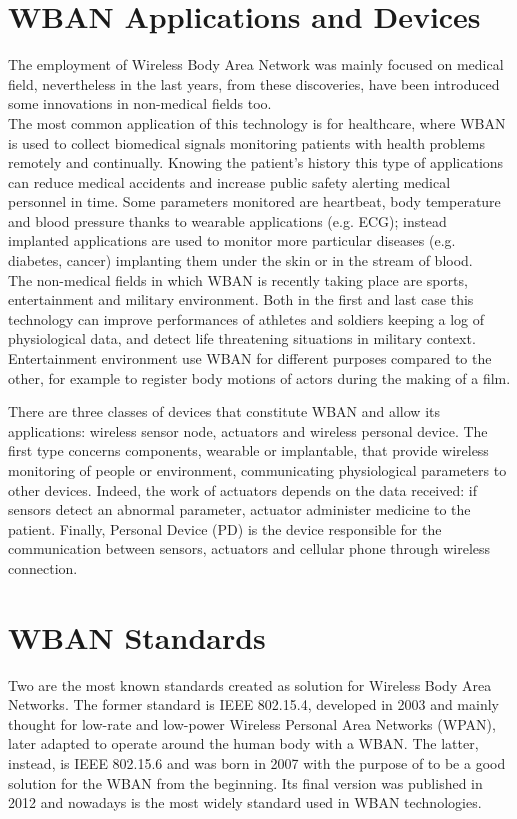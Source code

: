 \documentclass[conference]{IEEEtran}
\begin{document}
\section{WBAN Applications and Devices}
The employment of Wireless Body Area Network was mainly focused on medical field, nevertheless in the last years, from these discoveries, have been introduced some innovations in non-medical fields too.
\\The most common application of this technology is for healthcare, where WBAN is used to collect biomedical signals monitoring patients with health problems remotely and continually. 
Knowing the patient's history this type of applications can reduce medical accidents and increase public safety alerting medical personnel in time. Some parameters monitored are heartbeat, body temperature and blood pressure thanks to wearable applications (e.g. ECG); instead implanted applications are used to monitor more particular diseases (e.g. diabetes, cancer) implanting them under the skin or in the stream of blood.
\\The non-medical fields in which WBAN is recently taking place are sports, entertainment and military environment. Both in the first and last case this technology can improve performances of athletes and soldiers keeping a log of physiological data, and detect life threatening situations in military context. Entertainment environment use WBAN for different purposes compared to the other, for example to register body motions of actors during the making of a film.

There are three classes of devices that constitute WBAN and allow its applications: wireless sensor node, actuators and wireless personal device. The first type concerns components, wearable or implantable, that provide wireless monitoring of people or environment, communicating physiological parameters to other devices. Indeed, the work of actuators depends on the data received: if sensors detect an abnormal parameter, actuator administer medicine to the patient. Finally, Personal Device (PD) is the device responsible for the communication between sensors, actuators and cellular phone through wireless connection. \cite{salayma2017wireless}


\section{WBAN Standards}
Two are the most known standards created as solution for Wireless Body Area Networks. The former standard is IEEE 802.15.4, developed in 2003 and mainly thought for low-rate and low-power Wireless Personal Area Networks (WPAN), later adapted to operate around the human body with a WBAN. The latter, instead, is IEEE 802.15.6 and was born in 2007 with the purpose of to be a good solution for the WBAN from the beginning. Its final version was published in 2012 and nowadays is the most widely standard used in WBAN technologies.
\end{document}
